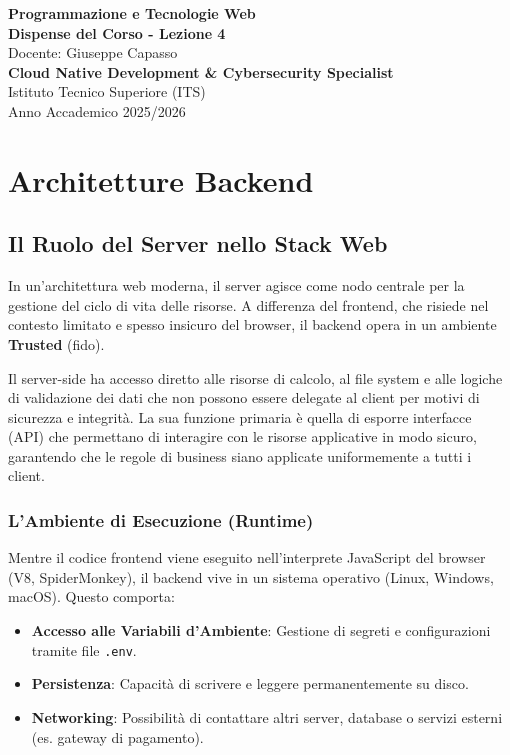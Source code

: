 \documentclass[11pt,a4paper]{report}
\begin{document}
\begin{titlepage}
    \centering
    \vspace*{4cm}
    {\Huge \textbf{\color{primary} Programmazione e Tecnologie Web}} \\[1.5cm]
    {\Large \textbf{Dispense del Corso - Lezione 4}} \\[0.5cm]
    {\large Docente: Giuseppe Capasso} \\[1.5cm]
    {\normalsize \textbf{Cloud Native Development \& Cybersecurity Specialist}} \\
    {\normalsize Istituto Tecnico Superiore (ITS)} \\
    \vfill
    {\normalsize Anno Accademico 2025/2026}
\end{titlepage}

\newpage
\tableofcontents
\newpage

\chapter{Architetture Backend}

\section{Il Ruolo del Server nello Stack Web}
In un'architettura web moderna, il server agisce come nodo centrale per la gestione del ciclo di vita delle risorse. A differenza del frontend, che risiede nel contesto limitato e spesso insicuro del browser, il backend opera in un ambiente \textbf{Trusted} (fido). 

Il server-side ha accesso diretto alle risorse di calcolo, al file system e alle logiche di validazione dei dati che non possono essere delegate al client per motivi di sicurezza e integrità. La sua funzione primaria è quella di esporre interfacce (API) che permettano di interagire con le risorse applicative in modo sicuro, garantendo che le regole di business siano applicate uniformemente a tutti i client.

\subsection{L'Ambiente di Esecuzione (Runtime)}
Mentre il codice frontend viene eseguito nell'interprete JavaScript del browser (V8, SpiderMonkey), il backend vive in un sistema operativo (Linux, Windows, macOS). Questo comporta:
\begin{itemize}
    \item \textbf{Accesso alle Variabili d'Ambiente}: Gestione di segreti e configurazioni tramite file \texttt{.env}.
    \item \textbf{Persistenza}: Capacità di scrivere e leggere permanentemente su disco.
    \item \textbf{Networking}: Possibilità di contattare altri server, database o servizi esterni (es. gateway di pagamento).
\end{itemize}
\end{document}
